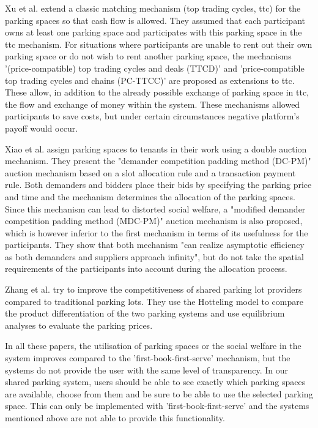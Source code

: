 \documentclass[
a4paper,     %
titlepage,   %
14pt         %
]{scrartcl}  %
\theoremstyle{mystyle}
\begin{document}
Xu et al. \cite{xu2016private} extend a classic matching mechanism (top trading cycles, ttc) for the parking spaces so that cash flow is allowed. They assumed that each participant owns at least one parking space and participates with this parking space in the ttc mechanism. For situations where participants are unable to rent out their own parking space or do not wish to rent another parking space, the mechanisms '(price-compatible) top trading cycles and deals (TTCD)' and 'price-compatible top trading cycles and chains (PC-TTCC)' are proposed as extensions to ttc. These allow, in addition to the already possible exchange of parking space in ttc, the flow and exchange of money within the system. These mechanisms allowed participants to save costs, but under certain circumstances negative platform's payoff would occur. 

Xiao et al. \cite{xiao2018shared} assign parking spaces to tenants in their work using a double auction mechanism. They present the "demander competition padding method (DC-PM)" auction mechanism based on a slot allocation rule and a transaction payment rule. Both demanders and bidders place their bids by specifying the parking price and time and the mechanism determines the allocation of the parking spaces. Since this mechanism can lead to distorted social welfare, a "modified demander competition padding method (MDC-PM)" auction mechanism is also proposed, which is however inferior to the first mechanism in terms of its usefulness for the participants. They show that both mechanism "can realize asymptotic efficiency as both demanders and suppliers approach infinity", but do not take the spatial requirements of the participants into account during the allocation process. 

Zhang et al. \cite{zhang2019pricing} try to improve the competitiveness of shared parking lot providers compared to traditional parking lots. They use the Hotteling model to compare the product differentiation of the two parking systems and use equilibrium analyses to evaluate the parking prices. 

In all these papers, the utilisation of parking spaces or the social welfare in the system improves compared to the 'first-book-first-serve' mechanism, but the systems do not provide the user with the same level of transparency. In our shared parking system, users should be able to see exactly which parking spaces are available, choose from them and be sure to be able to use the selected parking space. This can only be implemented with 'first-book-first-serve' and the systems mentioned above are not able to provide this functionality.\\
\end{document}
